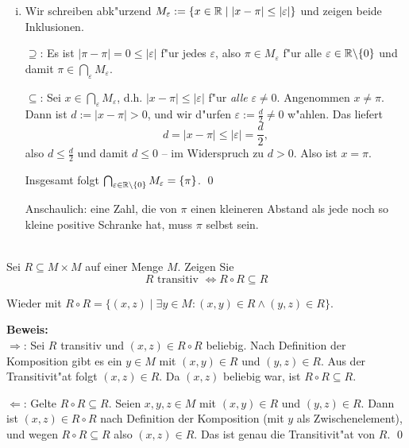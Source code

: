 \begin{loesung}
\begin{enumerate}[(i)]
$\Leftrightarrow \exists i\in I: x\in D_i\cap B$

$\Leftrightarrow x\in\bigcup_{i\in I}(D_i\cap B)$ \qed

\item Wir schreiben abk"urzend $M_\varepsilon:=\{x\in\mathbb{R}\mid |x-\pi|\leq|\varepsilon|\}$ und zeigen beide Inklusionen.

\glqq $\supseteq$\grqq: Es ist $|\pi-\pi|=0\leq|\varepsilon|$ f"ur jedes $\varepsilon$, also $\pi\in M_\varepsilon$ f"ur alle $\varepsilon\in\mathbb{R}\backslash\{0\}$ und damit $\pi\in\bigcap_\varepsilon M_\varepsilon$.

\glqq $\subseteq$\grqq: Sei $x\in\bigcap_\varepsilon M_\varepsilon$, d.h. $|x-\pi|\leq|\varepsilon|$ f"ur \emph{alle} $\varepsilon\neq 0$. Angenommen $x\neq\pi$. Dann ist $d:=|x-\pi|>0$, und wir d"urfen $\varepsilon:=\frac{d}{2}\neq 0$ w"ahlen. Das liefert
\[d=|x-\pi|\leq|\varepsilon|=\frac{d}{2},\]
also $d\leq\frac{d}{2}$ und damit $d\leq 0$ -- im Widerspruch zu $d>0$. Also ist $x=\pi$.

Insgesamt folgt $\bigcap_{\varepsilon\in\mathbb{R}\backslash\{0\}}M_\varepsilon=\{\pi\}$. \qed

Anschaulich: eine Zahl, die von $\pi$ einen kleineren Abstand als jede noch so kleine positive Schranke hat, muss $\pi$ selbst sein.
\end{enumerate}
\end{loesung}

\\
Sei $R\subseteq M\times M$ auf einer Menge $M$. Zeigen Sie \[R\mbox{ transitiv }\Leftrightarrow R\circ R\subseteq R\]

\begin{loesung}
Wieder mit $R\circ R=\{(x,z)\mid\exists y\in M:(x,y)\in R\wedge (y,z)\in R\}$.

\textbf{Beweis:}\\
\glqq $\Rightarrow$\grqq: Sei $R$ transitiv und $(x,z)\in R\circ R$ beliebig. Nach Definition der Komposition gibt es ein $y\in M$ mit $(x,y)\in R$ und $(y,z)\in R$. Aus der Transitivit"at folgt $(x,z)\in R$. Da $(x,z)$ beliebig war, ist $R\circ R\subseteq R$.

\glqq $\Leftarrow$\grqq: Gelte $R\circ R\subseteq R$. Seien $x,y,z\in M$ mit $(x,y)\in R$ und $(y,z)\in R$. Dann ist $(x,z)\in R\circ R$ nach Definition der Komposition (mit $y$ als Zwischenelement), und wegen $R\circ R\subseteq R$ also $(x,z)\in R$. Das ist genau die Transitivit"at von $R$. \qed
\end{loesung}


